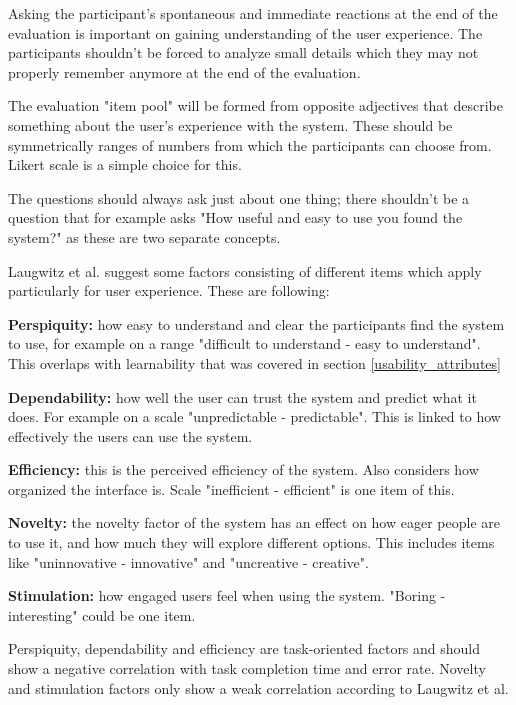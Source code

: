 Asking the participant's spontaneous and immediate reactions at the end of the evaluation is important on gaining understanding of the user experience. The participants shouldn't be forced to analyze small details which they may not properly remember anymore at the end of the evaluation. 

The evaluation "item pool" will be formed from opposite adjectives that describe something about the user's experience with the system. These should be symmetrically ranges of numbers from which the participants can choose from. Likert scale is a simple choice for this. \cite{laugwitz2008construction} \cite{likert1932technique}

The questions should always ask just about one thing; there shouldn't be a question that for example asks "How useful and easy to use you found the system?" as these are two separate concepts.

Laugwitz et al. suggest some factors consisting of different items which apply particularly for user experience. These are following:

\textbf{Perspiquity:} how easy to understand and clear the participants find the system to use, for example on a range "difficult to understand - easy to understand". This overlaps with learnability that was covered in section \ref{usability_attributes}

\textbf{Dependability:} how well the user can trust the system and predict what it does. For example on a scale "unpredictable - predictable". This is linked to how effectively the users can use the system.

\textbf{Efficiency:} this is the perceived efficiency of the system. Also considers how organized the interface is. Scale "inefficient - efficient" is one item of this.

\textbf{Novelty:} the novelty factor of the system has an effect on how eager people are to use it, and how much they will explore different options. This includes items like "uninnovative - innovative" and "uncreative - creative".

\textbf{Stimulation:} how engaged users feel when using the system. "Boring - interesting" could be one item.

Perspiquity, dependability and efficiency are task-oriented factors and should show a negative correlation with task completion time and error rate. Novelty and stimulation factors only show a weak correlation according to Laugwitz et al.

\cite{laugwitz2008construction}

